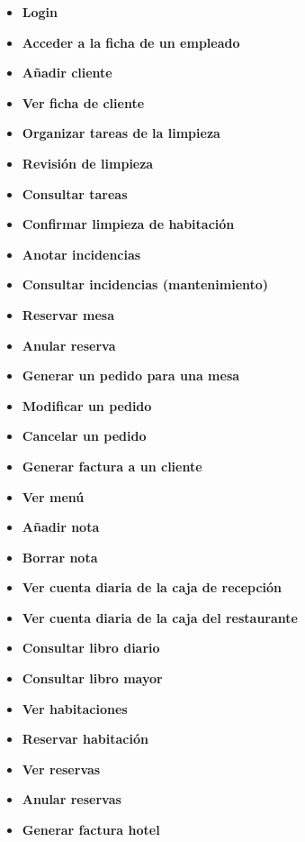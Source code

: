 \documentclass[spanish,a4paper,11pt, twoside]{report}	%
\begin{document}
	\begin{itemize}
	\item \textbf{Login}	
	\item \textbf{Acceder a la ficha de un empleado}
	\item \textbf{Añadir cliente}
	\item \textbf{Ver ficha de cliente}
	\item \textbf{Organizar tareas de la limpieza}
	\item \textbf{Revisión de limpieza}
	\item \textbf{Consultar tareas}
	\item \textbf{Confirmar limpieza de habitación}
	\item \textbf{Anotar incidencias}	
	\item \textbf{Consultar incidencias (mantenimiento)}
	\item \textbf{Reservar mesa}
	\item \textbf{Anular reserva}
	\item \textbf{Generar un pedido para una mesa}
	\item \textbf{Modificar un pedido}
	\item \textbf{Cancelar un pedido}
	\item \textbf{Generar factura a un cliente}
	\item \textbf{Ver menú}
	\item \textbf{Añadir nota}
	\item \textbf{Borrar nota}
	\item \textbf{Ver cuenta diaria de la caja de recepción}
	\item \textbf{Ver cuenta diaria de la caja del restaurante}
	\item \textbf{Consultar libro diario}
	\item \textbf{Consultar libro mayor}
	\item \textbf{Ver habitaciones}	
	\item \textbf{Reservar habitación}
	\item \textbf{Ver reservas}
	\item \textbf{Anular reservas}
	\item \textbf{Generar factura hotel}
	
	\end{itemize}
\end{document}
